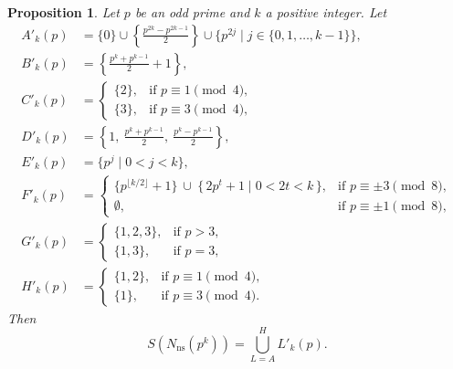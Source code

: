 \documentclass[10pt,a4paper]{amsart}
\newtheorem{proposition}{Proposition}
\begin{document}
\begin{proposition}
     Let $p$ be an odd prime and $k$ a positive integer.  Let $$
\begin{aligned}
A'_k(p)&=\{0\} \cup \left\{ \frac{p^{2k}-p^{2k-1}}{2} \right\}\cup \{p^{2j} \mid j\in \{0,1,\ldots,k-1\}\},\\
B'_k(p)&=\left\{\frac{p^k+p^{k-1}}{2}+1\right\},\\
C'_k(p)&=\begin{cases}
\{2\}, & \text{if } p\equiv 1\pmod{4},\\[4pt]
\{3\}, & \text{if } p\equiv 3\pmod{4},
\end{cases}\\
D'_k(p)&=\left\{1,\ \frac{p^k+p^{k-1}}{2},\ \frac{p^k-p^{k-1}}{2}\right\},\\
E'_k(p)&=\{p^j \mid 0<j<k\},\\
F'_k(p)&=\begin{cases}
\{p^{\lfloor k/2 \rfloor}+1\}\ \cup\ \{\,2p^t+1 \mid 0<2t<k\,\}, & \text{if } p\equiv \pm 3 \pmod 8,\\[4pt]
\emptyset, & \text{if } p\equiv \pm 1 \pmod 8,
\end{cases}\\
G'_k(p)&=\begin{cases}
\{1,2,3\}, & \text{if } p>3,\\[4pt]
\{1,3\}, & \text{if } p=3,
\end{cases}\\
H'_k(p)&=\begin{cases}
\{1,2\}, & \text{if } p\equiv 1\pmod{4},\\[4pt]
\{1\}, & \text{if } p\equiv 3\pmod{4}.
\end{cases}
\end{aligned}
$$ Then 
    $$S(N_{\mathrm{ns}}(p^k))=\bigcup_{L=A}^H L'_k(p).$$
\end{proposition}
\end{document}
